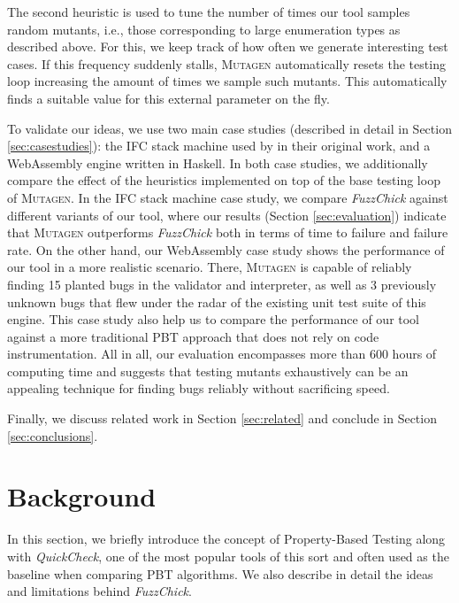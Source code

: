 \documentclass[acmsmall, anonymous]{acmart}
\newcommand{\quickcheck}{\textit{QuickCheck}\xspace}
\newcommand{\fuzzchick}{\textit{FuzzChick}\xspace}
\newcommand{\mutagen}{\textsc{Mutagen}\xspace}
\begin{document}
The second heuristic is used to tune the number of times our tool samples random
mutants, i.e., those corresponding to large enumeration types as described above.
%
For this, we keep track of how often we generate interesting test cases.
%
If this frequency suddenly stalls, \mutagen automatically resets the testing
loop increasing the amount of times we sample such mutants.
%
This automatically finds a suitable value for this external parameter on the
fly.


To validate our ideas, we use two main case studies (described in detail in
Section \ref{sec:casestudies}): the IFC stack machine used by
\citeauthor{lampropoulos2019coverage} in their original work, and a WebAssembly
engine written in Haskell.
%
In both case studies, we additionally compare the effect of the heuristics
implemented on top of the base testing loop of \mutagen.
%
In the IFC stack machine case study, we compare \fuzzchick against different
variants of our tool, where our results (Section \ref{sec:evaluation}) indicate
that \mutagen outperforms \fuzzchick both in terms of time to failure and
failure rate.
%
On the other hand, our WebAssembly case study shows the performance of our tool
in a more realistic scenario.
%
There, \mutagen is capable of reliably finding 15 planted bugs in the validator
and interpreter, as well as 3 previously unknown bugs that flew under the radar
of the existing unit test suite of this engine.
%
This case study also help us to compare the performance of our tool against a
more traditional PBT approach that does not rely on code instrumentation.
%
All in all, our evaluation encompasses more than 600 hours of computing time and
suggests that testing mutants exhaustively can be an appealing technique for
finding bugs reliably without sacrificing speed.


Finally, we discuss related work in Section \ref{sec:related} and conclude
in Section \ref{sec:conclusions}.



\vspace{-5pt}

\section{Background}
\label{sec:background}

In this section, we briefly introduce the concept of Property-Based Testing
along with \quickcheck, one of the most popular tools of this sort and often
used as the baseline when comparing PBT algorithms.
%
We also describe in detail the ideas and limitations behind \fuzzchick.
\end{document}
